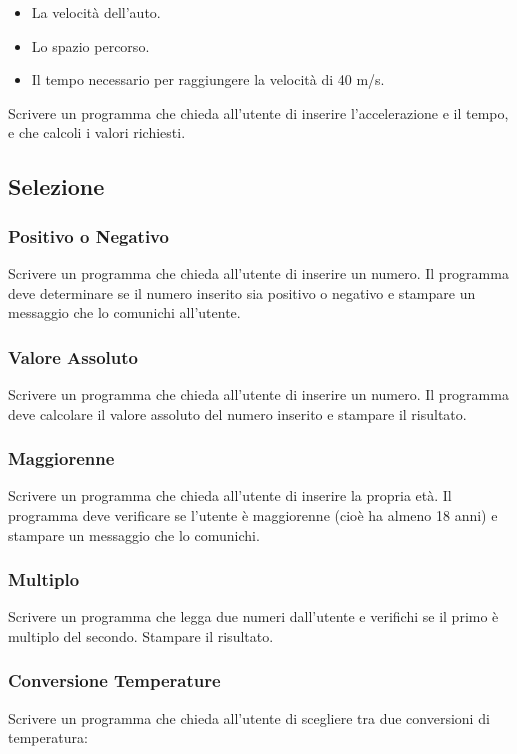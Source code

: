 \documentclass[a4paper,12pt]{article}
\begin{document}
	\begin{itemize}
		\item 	La velocità dell’auto.
		\item 	Lo spazio percorso.
		\item 	Il tempo necessario per raggiungere la velocità di 40 m/s.
	\end{itemize}

	
	Scrivere un programma che chieda all’utente di inserire l’accelerazione e il tempo, e che calcoli i valori richiesti.
	


\newpage

\subsection{Selezione}

\subsubsection{Positivo o Negativo}

Scrivere un programma che chieda all’utente di inserire un numero. Il programma deve determinare se il numero inserito sia positivo o negativo e stampare un messaggio che lo comunichi all’utente.
	

\subsubsection{Valore Assoluto}
Scrivere un programma che chieda all’utente di inserire un numero. Il programma deve calcolare il valore assoluto del numero inserito e stampare il risultato.

\subsubsection{Maggiorenne}
Scrivere un programma che chieda all’utente di inserire la propria età. Il programma deve verificare se l’utente è maggiorenne (cioè ha almeno 18 anni) e stampare un messaggio che lo comunichi.


\subsubsection{Multiplo}
Scrivere un programma che legga due numeri dall’utente e verifichi se il primo è multiplo del secondo. Stampare il risultato.
	
	
\subsubsection{Conversione Temperature}
Scrivere un programma che chieda all’utente di scegliere tra due conversioni di temperatura:
\end{document}
